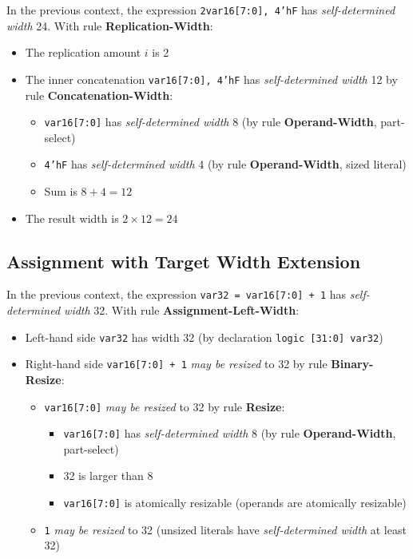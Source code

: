 \documentclass{article}
\newcommand{\sv}[1]{\texttt{#1}}
\newcommand{\sds}{\emph{self-determined width}}
\newcommand{\mbr}{\emph{may be resized}}
\begin{document}
In the previous context, the expression \sv{{2{var16[7:0], 4'hF}}} has \sds{}
24. With rule \textbf{Replication-Width}:

\begin{itemize}
  \item The replication amount $i$ is 2
  \item The inner concatenation \sv{{var16[7:0], 4'hF}} has
    \sds{} 12 by rule \textbf{Concatenation-Width}:
    \begin{itemize}
      \item \sv{var16[7:0]} has \sds{} 8 (by rule
        \textbf{Operand-Width}, part-select)
      \item \sv{4'hF} has \sds{} 4 (by rule
        \textbf{Operand-Width}, sized literal)
      \item Sum is $8 + 4 = 12$
    \end{itemize}
  \item The result width is $2 \times 12 = 24$
\end{itemize}

\subsection{Assignment with Target Width Extension}

In the previous context, the expression \sv{var32 = var16[7:0] + 1} has
\sds{} 32. With rule \textbf{Assignment-Left-Width}:

\begin{itemize}
  \item Left-hand side \sv{var32} has width 32 (by declaration
    \sv{logic [31:0] var32})
  \item Right-hand side \sv{var16[7:0] + 1} \mbr{} to 32 by
    rule \textbf{Binary-Resize}:
    \begin{itemize}
      \item \sv{var16[7:0]} \mbr{} to 32 by rule
        \textbf{Resize}:
        \begin{itemize}
          \item \sv{var16[7:0]} has \sds{} 8
            (by rule \textbf{Operand-Width}, part-select)
          \item 32 is larger than 8
          \item \sv{var16[7:0]} is atomically resizable
            (operands are atomically resizable)
        \end{itemize}
      \item \sv{1} \mbr{} to 32 (unsized literals have
        \sds{} at least 32)
    \end{itemize}
\end{itemize}
\end{document}
